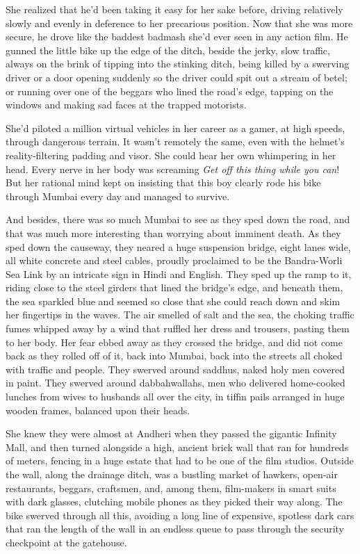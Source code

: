 She realized that he'd been taking it easy for her sake before,
driving relatively slowly and evenly in deference to her precarious
position. Now that she was more secure, he drove like the baddest
badmash she'd ever seen in any action film. He gunned the little
bike up the edge of the ditch, beside the jerky, slow traffic,
always on the brink of tipping into the stinking ditch, being
killed by a swerving driver or a door opening suddenly so the
driver could spit out a stream of betel; or running over one of the
beggars who lined the road's edge, tapping on the windows and
making sad faces at the trapped motorists.

She'd piloted a million virtual vehicles in her career as a gamer,
at high speeds, through dangerous terrain. It wasn't remotely the
same, even with the helmet's reality-filtering padding and visor.
She could hear her own whimpering in her head. Every nerve in her
body was screaming \emph{Get off this thing while you can}! But her
rational mind kept on insisting that this boy clearly rode his bike
through Mumbai every day and managed to survive.

And besides, there was so much Mumbai to see as they sped down the
road, and that was much more interesting than worrying about
imminent death. As they sped down the causeway, they neared a huge
suspension bridge, eight lanes wide, all white concrete and steel
cables, proudly proclaimed to be the Bandra-Worli Sea Link by an
intricate sign in Hindi and English. They sped up the ramp to it,
riding close to the steel girders that lined the bridge's edge, and
beneath them, the sea sparkled blue and seemed so close that she
could reach down and skim her fingertips in the waves. The air
smelled of salt and the sea, the choking traffic fumes whipped away
by a wind that ruffled her dress and trousers, pasting them to her
body. Her fear ebbed away as they crossed the bridge, and did not
come back as they rolled off of it, back into Mumbai, back into the
streets all choked with traffic and people. They swerved around
saddhus, naked holy men covered in paint. They swerved around
dabbahwallahs, men who delivered home-cooked lunches from wives to
husbands all over the city, in tiffin pails arranged in huge wooden
frames, balanced upon their heads.

She knew they were almost at Andheri when they passed the gigantic
Infinity Mall, and then turned alongside a high, ancient brick wall
that ran for hundreds of meters, fencing in a huge estate that had
to be one of the film studios. Outside the wall, along the drainage
ditch, was a bustling market of hawkers, open-air restaurants,
beggars, craftsmen, and, among them, film-makers in smart suits
with dark glasses, clutching mobile phones as they picked their way
along. The bike swerved through all this, avoiding a long line of
expensive, spotless dark cars that ran the length of the wall in an
endless queue to pass through the security checkpoint at the
gatehouse.

